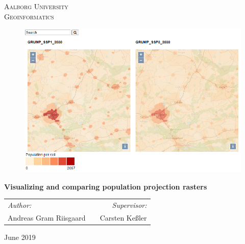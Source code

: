 \thispagestyle{empty}

\begin{center}
\textsc{\LARGE Aalborg University}\\%
\textsc{\Large Geoinformatics}\\[1.cm]
\end{center}

\begin{figure} [H]
	\centering
	\includegraphics[width=1\textwidth]{Pictures/Frontpage}	
	\label{forside}
\end{figure}

\vfill
\begin{center}
{ \huge \bfseries {Visualizing and comparing population projection rasters}}\\[0.2cm]
\end{center}

\begin{tabularx}{\textwidth}{l X r}
	\hline
	\emph{Author:} & & \emph{Supervisor:}\\
	Andreas Gram Riisgaard	&	 &	 Carsten Ke{\ss}ler \\
	\hline
\end{tabularx}

\vfill

{\large June 2019}

\frontmatter

